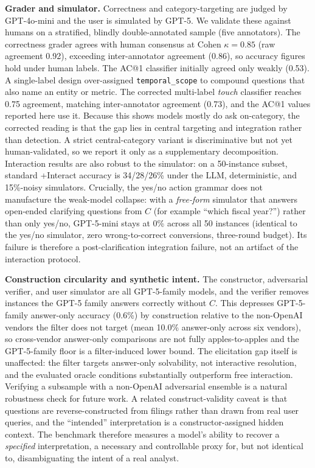 \textbf{Grader and simulator.} Correctness and
category-targeting are judged by GPT-4o-mini and the user is simulated by GPT-5. We validate
these against humans on a stratified, blindly double-annotated sample (five annotators).
The correctness grader agrees with human consensus at Cohen $\kappa{=}0.85$ (raw agreement
0.92), exceeding inter-annotator agreement (0.86), so accuracy figures hold under human
labels. The AC@1 classifier initially agreed only weakly (0.53). A single-label design
over-assigned \texttt{temporal\_scope} to compound questions that also name an entity or
metric. The corrected multi-label \emph{touch} classifier reaches 0.75 agreement, matching
inter-annotator agreement (0.73), and the AC@1 values reported here use it. Because
this shows models mostly do ask on-category, the corrected reading is that the gap lies in
central targeting and integration rather than detection. A strict central-category variant is
discriminative but not yet human-validated, so we report it only as a supplementary
decomposition. Interaction results are also robust to the simulator: on a
50-instance subset, standard +Interact accuracy is 34/28/26\% under the LLM, deterministic,
and 15\%-noisy simulators. Crucially, the yes/no action grammar does not manufacture the
weak-model collapse: with a \emph{free-form} simulator that answers open-ended clarifying
questions from $C$ (for example ``which fiscal year?'') rather than only yes/no, GPT-5-mini
stays at 0\% across all 50 instances (identical to the yes/no simulator, zero
wrong-to-correct conversions, three-round budget). Its failure is therefore a
post-clarification integration failure, not an artifact of the interaction protocol.

\textbf{Construction circularity and synthetic intent.} The constructor, adversarial verifier, and user
simulator are all GPT-5-family models, and the verifier removes instances the GPT-5 family
answers correctly without $C$. This depresses GPT-5-family answer-only accuracy (0.6\%) by
construction relative to the non-OpenAI vendors the filter does not target (mean 10.0\%
answer-only across six vendors), so cross-vendor answer-only comparisons are not fully
apples-to-apples and the GPT-5-family floor is a filter-induced lower bound. The elicitation
gap itself is unaffected: the filter targets answer-only solvability, not interactive
resolution, and the evaluated oracle conditions substantially outperform free interaction. Verifying a
subsample with a non-OpenAI adversarial ensemble is a natural robustness check for future work.
A related construct-validity caveat is that questions are reverse-constructed from filings
rather than drawn from real user queries, and the ``intended'' interpretation is a
constructor-assigned hidden context. The benchmark therefore measures a model's ability to
recover a \emph{specified} interpretation, a necessary and controllable proxy for, but not
identical to, disambiguating the intent of a real analyst.

